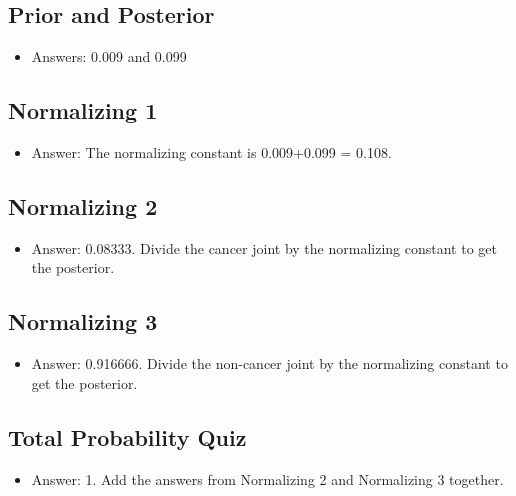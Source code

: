 \documentclass[12pt]{report}
\begin{document}
\subsection{Prior and Posterior}

\begin{itemize}

\item Answers: 0.009 and  0.099

\end{itemize}

\subsection{Normalizing 1}

\begin{itemize}

\item Answer: The normalizing constant is 0.009+0.099 = 0.108. 

\end{itemize}

\subsection{Normalizing 2}

\begin{itemize}

\item Answer: 0.08333. Divide the cancer joint by the normalizing constant to get the posterior. 

\end{itemize}

\subsection{Normalizing 3}

\begin{itemize}

\item Answer: 0.916666. Divide the non-cancer joint by the normalizing constant to get the posterior. 

\end{itemize}

\subsection{Total Probability Quiz}

\begin{itemize}

\item Answer: 1. Add the answers from Normalizing 2 and Normalizing 3 together.

\end{itemize}
\end{document}
